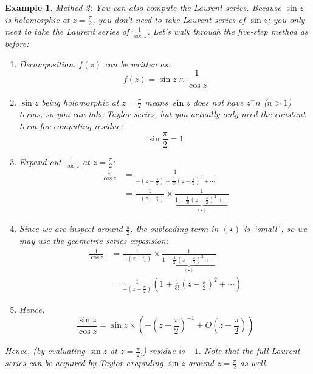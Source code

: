 \documentclass[a4paper]{article}
\newtheorem{example}{Example}
\begin{document}
\begin{example}
    \underline{Method 2}: You can also compute the Laurent series. Because $\sin z$ is holomorphic at $z=\frac{\pi}{2}$, you don't need to take Laurent series of $\sin z$; you only need to take the Laurent series of $\frac{1}{\cos z}$.
    Let's walk through the five-step method as before:
    \begin{enumerate}
        \item Decomposition: $f(z)$ can be written as:
            \begin{equation*}
                f(z) = \sin{z} \times \frac{1}{\cos{z}}
            \end{equation*}
        \item $\sin z$ being holomorphic at $z=\frac{\pi}{2}$ means $\sin z$ does not have $z^-n$ ($n > 1$) terms, so you can take Taylor series, but you actually only need the constant term for computing residue:
            \begin{equation*}
                \sin{\frac{\pi}{2}} = 1
            \end{equation*}
        \item Expand out $\frac{1}{\cos{z}}$ at $z=\frac{\pi}{2}$:
            \begin{align*}
                \frac{1}{\cos{z}} &= \frac{1}{-\left( z-\frac{\pi}{2} \right) + \frac{1}{3!}\left( z-\frac{\pi}{2} \right)^{3} + \cdots} \\
                &= \frac{1}{-\left( z-\frac{\pi}{2} \right)} \times \frac{1}{\underbrace{1 - \frac{1}{3!}\left( z-\frac{\pi}{2} \right)^2 + \cdots}_{(\star)}}
            \end{align*}
        \item Since we are inspect around $\frac{\pi}{2}$, the subleading term in $(\star)$ is ``small'', so we may use the geometric series expansion:
            \begin{align*}
                \frac{1}{\cos{z}} &= \frac{1}{-\left( z-\frac{\pi}{2} \right)} \times \frac{1}{\underbrace{1 - \frac{1}{3!}\left( z-\frac{\pi}{2} \right)^2 + \cdots}_{(\star)}} \\
                &= \frac{1}{-\left( z-\frac{\pi}{2} \right)} \left( 1 + \frac{1}{3!}\left( z-\frac{\pi}{2} \right)^2 + \cdots \right)
            \end{align*}
        \item Hence,
            \begin{equation*}
                \frac{\sin{z}}{\cos{z}} = \sin{z} \times \left( -\left( z-\frac{\pi}{2} \right)^{-1} + O\left( z-\frac{\pi}{2} \right) \right)
            \end{equation*}
    \end{enumerate}
    Hence, (by evaluating $\sin{z}$ at $z=\frac{\pi}{2}$,) residue is $-1$.
    Note that the full Laurent series can be acquired by Taylor exapnding $\sin z$ around $z=\frac{\pi}{2}$ as well.
\end{example}
\end{document}
